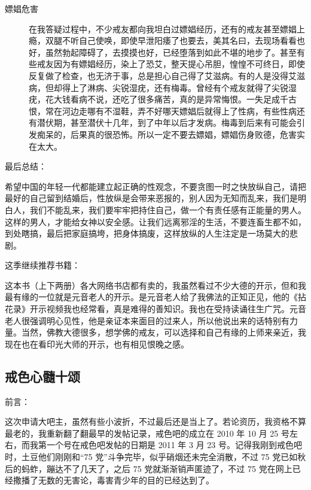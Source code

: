 \begin{description}
    \item[嫖娼危害] 在我答疑过程中，不少戒友都向我坦白过嫖娼经历，还有的戒友甚至嫖娼上瘾，双腿不听自己使唤，即使早泄阳痿了也要去，美其名曰，去现场看看也好，虽然勃起障碍了，去摸摸也好，已经堕落到如此不堪的地步了。甚至有些戒友因为有嫖娼经历，染上了恐艾，整天提心吊胆，惶惶不可终日，即使反复做了检查，也无济于事，总是担心自己得了艾滋病。有的人是没得艾滋病，但却得上了淋病、尖锐湿疣，还有梅毒。曾经有个戒友就得了尖锐湿疣，花大钱看病不说，还吃了很多痛苦，真的是异常悔恨。一失足成千古恨，常在河边走哪有不湿鞋，弄不好哪天嫖娼后就得上了性病，有些性病还有潜伏期，甚至潜伏十几年，到了中年以后才发病。梅毒到后来有可能会引发痴呆的，后果真的很恐怖。所以一定不要去嫖娼，嫖娼伤身败德，危害实在太大。
\end{description}

最后总结：

希望中国的年轻一代都能建立起正确的性观念，不要贪图一时之快放纵自己，请把最好的自己留到结婚后，性放纵是会带来恶报的，别人因为无知而乱来，我们是明白人，我们不能乱来，我们要牢牢把持住自己，做一个有责任感有正能量的男人。这样的男人，才能给女神以安全感。让我们远离邪淫的生活，不要连畜生都不如，到处瞎搞，最后把家庭搞垮，把身体搞废，这样放纵的人生注定是一场莫大的悲剧。

这季继续推荐书籍：

\begin{book}
    这本书（上下两册）各大网络书店都有卖的，我虽然看过不少大德的开示，但和我最有缘的一位就是元音老人的开示。是元音老人给了我佛法的正知正见，他的《拈花录》开示视频我也经常看，真是难得的善知识。我也在受持读诵往生广咒。元音老人很强调明心见性，他是亲证本来面目的过来人，所以他说出来的话特别有力量。当然，佛教大德很多，想学佛的戒友，可以选择和自己有缘的上师来亲近，我现在也在看印光大师的开示，也有相见恨晚之感。
\end{book}

\subsection{戒色心髓十颂}

前言：

这次申请大吧主，虽然有些小波折，不过最后还是当上了。若论资历，我资格不算最老的，我重新翻了翻最早的发帖记录，戒色吧的成立在 2010 年 10 月 25 号左右，而我第一个号在戒色吧发帖的日期是 2011 年 3 月 23 号。记得我刚到戒色吧时，土豆他们刚刚和“75 党”斗争完毕，似乎硝烟还未完全消散，不过 75 党已如秋后的蚂蚱，蹦达不了几天了，之后 75 党就渐渐销声匿迹了，不过 75 党在网上已经撒播了无数的无害论，毒害青少年的目的已经达到了。

